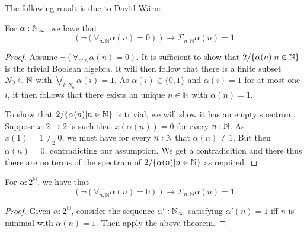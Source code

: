 The following result is due to David W\"arn:
\begin{theorem}\label{MarkovPrinciple}
  For $\alpha:\mathbb{N}_{\infty}$, we have that 
  \begin{equation}
    (\neg (\forall_{n:\mathbb N} \alpha (n)= 0)) \to \Sigma_{n:\mathbb N} \alpha (n)= 1
  \end{equation}
\end{theorem}
\begin{proof}
  Assume $\neg (\forall_{n:\mathbb N} \alpha (n)= 0)$.
  It is sufficient to show that $2/\{\alpha(n)|n\in\mathbb{N}\}$ is the trivial Boolean algebra. 
  It will then follow that there is a finite subset $N_0\subseteq \mathbb{N}$ 
  with $\bigvee_{i:N_0} \alpha(i) = 1$.
  As $\alpha(i) \in \{0,1\}$ and $\alpha(i) = 1$ for at most one $i$, it then follows that 
  there exists an unique $n\in\mathbb N$ with $\alpha(n) = 1$. 

  To show that $2/\{\alpha(n)|n\in\mathbb{N}\}$ is trivial, we will show it has an empty spectrum. 
  Suppose $x: 2 \to 2$ is such that $x(\alpha(n)) = 0$ for every $n:\mathbb{N}$. 
  As $x(1) = 1\neq_2 0$, we must have for every $n:\mathbb{N}$ that $\alpha(n) \neq 1$. 
  But then $\alpha(n) = 0$, contradicting our assumption. 
  We get a contradicition and there thus there are no terms of the spectrum of $2/\{\alpha(n)|n\in\mathbb{N}\}$ as required. 
\end{proof}
\begin{corollary}
  For $\alpha:2^\mathbb N$, we have that 
  \begin{equation}
    (\neg (\forall_{n:\mathbb N} \alpha (n)= 0)) \to \Sigma_{n:\mathbb N} \alpha (n)= 1
  \end{equation}
\end{corollary}
\begin{proof}
  Given $\alpha:2^\mathbb N$, consider the sequence $\alpha':\mathbb{N}_{\infty}$ satisfying $\alpha'(n) = 1$ iff 
  $n$ is minimal with $\alpha(n) = 1$. Then apply the above theorem.
\end{proof}

